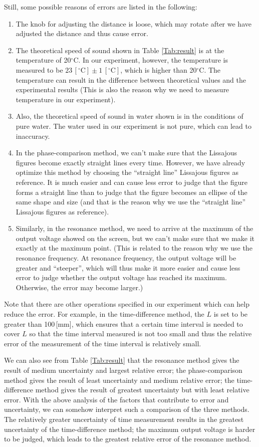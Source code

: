 \documentclass[a4paper]{article}
\begin{document}
Still, some possible reasons of errors are listed in the following:
\begin{enumerate}
\item The knob for adjusting the distance is loose, which may rotate after we have adjusted the distance and thus cause error.
\item The theoretical speed of sound shown in Table \ref{Tab:result} is at the temperature of 20$^{\circ}$C. In our experiment, however, the temperature is measured to be $23\,[^{\circ}\text{C}] \pm 1\, [^{\circ}\text{C}]$, which is higher than 20$^{\circ}$C. The temperature can result in the difference between theoretical values and the experimental results (This is also the reason why we need to measure temperature in our experiment).
\item Also, the theoretical speed of sound in water shown is in the conditions of pure water. The water used in our experiment is not pure, which can lead to inaccuracy.
\item In the phase-comparison method, we can't make sure that the Lissajous figures become exactly straight lines every time. However, we have already optimize this method by choosing the ``straight line'' Lissajous figures as reference. It is much easier and can cause less error to judge that the figure forms a straight line than to judge that the figure becomes an ellipse of the same shape and size (and that is the reason why we use the ``straight line'' Lissajous figures as reference).
\item Similarly, in the resonance method, we need to arrive at the maximum of the output voltage showed on the screen, but we can't make sure that we make it exactly at the maximum point. (This is related to the reason why we use the resonance frequency. At resonance frequency, the output voltage will be greater and ``steeper'', which will thus make it more easier and cause less error to judge whether the output voltage has reached its maximum. Otherwise, the error may become larger.)
\end{enumerate}

Note that there are other operations specified in our experiment which can help reduce the error. For example, in the time-difference method, the $L$ is set to be greater than 100\,[mm], which ensures that a certain time interval is needed to cover $L$ so that the time interval measured is not too small and thus the relative error of the measurement of the time interval is relatively small.

We can also see from Table \ref{Tab:result} that the resonance method gives the result of medium uncertainty and largest relative error; the phase-comparison method gives the result of least uncertainty and medium relative error; the time-difference method gives the result of greatest uncertainty but with least relative error. With the above analysis of the factors that contribute to error and uncertainty, we can somehow interpret such a comparison of the three methods. The relatively greater uncertainty of time measurement results in the greatest uncertainty of the time-difference method; the maximum output voltage is harder to be judged, which leads to the greatest relative error of the resonance method.
\end{document}
